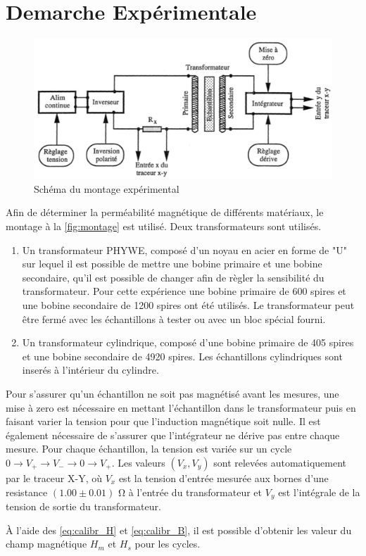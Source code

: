 \section{Demarche Expérimentale}

\begin{figure}[h]
    \centering
    \includegraphics[width=0.8\linewidth]{figures/montage.png}
    \caption{Schéma du montage expérimental \cite{notice}}
    \label{fig:montage}
\end{figure}

Afin de déterminer la perméabilité magnétique de différents matériaux, le montage à la \autoref{fig:montage} est utilisé. Deux transformateurs sont utilisés.

\begin{enumerate}
    \item Un transformateur PHYWE, composé d'un noyau en acier en forme de "U" sur lequel il est possible de mettre une bobine primaire et une bobine secondaire, qu'il est possible de changer afin de règler la sensibilité du transformateur. Pour cette expérience une bobine primaire de 600 spires et une bobine secondaire de 1200 spires ont été utilisés. Le transformateur peut être fermé avec les échantillons à tester ou avec un bloc spécial fourni.
    \item Un transformateur cylindrique, composé d'une bobine primaire de 405 spires et une bobine secondaire de 4920 spires. Les échantillons cylindriques sont inserés à l'intérieur du cylindre.
\end{enumerate}

Pour s'assurer qu'un échantillon ne soit pas magnétisé avant les mesures, une mise à zero est nécessaire en mettant l'échantillon dans le transformateur puis en faisant varier la tension pour que l'induction magnétique soit nulle. Il est également nécessaire de s'assurer que l'intégrateur ne dérive pas entre chaque mesure. Pour chaque échantillon, la tension est variée sur un cycle \(0 \rightarrow V_+ \rightarrow V_- \rightarrow 0 \rightarrow V_+\). Les valeurs \((V_x, V_y)\) sont relevées automatiquement par le traceur X-Y, où \(V_x\) est la tension d'entrée mesurée aux bornes d'une resistance \((1.00 \pm 0.01)\) \si{\ohm} à l'entrée du transformateur et \(V_y\) est l'intégrale de la tension de sortie du transformateur.

À l'aide des \autoref{eq:calibr_H} et \autoref{eq:calibr_B}, il est possible d'obtenir les valeur du champ magnétique \(H_m\) et \(H_s\) pour les cycles.
